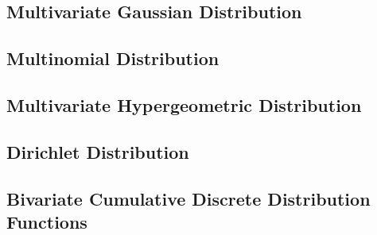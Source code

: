 \documentclass[11pt]{report} %
\begin{document}
\subsection{Multivariate Gaussian Distribution}

\subsection{Multinomial Distribution}

\subsection{Multivariate Hypergeometric Distribution}

\subsection{Dirichlet Distribution}

\subsection{Bivariate Cumulative Discrete Distribution Functions}
\end{document}
